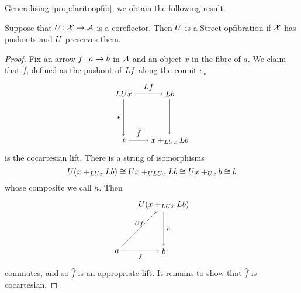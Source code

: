 \documentclass{amsart}
\begin{document}
Generalising \cref{prop:laritoopfib}, we obtain the following result.

\begin{prop}
  \label{thm:corefl-to-street-opfib}
  Suppose that $ U \colon \mathcal{X} \to \mathcal{A} $ is a
  coreflector. Then $ U $ is a Street opfibration
  if $ \mathcal{X} $ has pushouts and $ U $ preserves them.
\end{prop}

\begin{proof}
  Fix an arrow $ f \colon a \to b $ in $ \mathcal{A} $
  and an object $ x $ in the fibre of $ a $. We
  claim that $ \hat{f} $, defined as the pushout
  of $ L f $
  along the counit $ \epsilon_x $
  \[
    \begin{tikzpicture}
      \node (ul) at (0,2) {$ \L \U x $};
      \node (ll) at (0,0) {$ x $};
      \node (ur) at (2,2) {$ \L b $};
      \node (lr) at (2,0) {$ x +_{\L\U x} \L b$};
      \draw [->] (ul) to node [left] {$ \epsilon $} (ll);
      \draw [->] (ul) to node [above] {$ \L f $} (ur);
      \draw [->] (ll) to node [above] {$ \hat{f} $} (lr);
      \draw [->] (ur) to (lr);
    \end{tikzpicture}
  \]
  is the cocartesian lift. There is a string of
  isomorphisms
  \[
    U ( x +_{LU x} L b ) \cong
    U x +_{ULU x} L b \cong
    U x +_{U x} b \cong
    b
  \]
  whose composite we call $ h $.  Then
  \[
    \begin{tikzpicture}
      \node (a) at (0,0) {$ a $};
      \node (b) at (2,0) {$ b $};
      \node (c) at (2,2) {$ \U ( x+_{\L\U x} \L b ) $};
      \path[->,font=\scriptsize]
      (a) edge node[below]{$ f $} (b)
      (a) edge node[above]{$ \U\hat{f} $} (c)
      (c) edge node[right]{$ h $} (b);
    \end{tikzpicture}
  \]
  commutes, and so $ \hat{f} $ is an appropriate
  lift. It remains to show that $ \hat{f} $ is
  cocartesian.


\end{proof}
\end{document}
